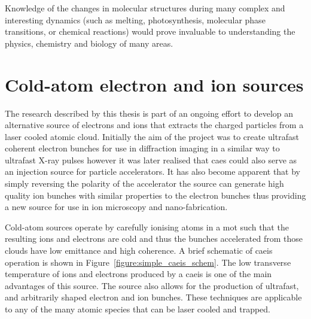 Knowledge of the changes in molecular structures during many complex and interesting dynamics (such as melting, photosynthesis, molecular phase transitions, or chemical reactions) would prove invaluable to understanding the physics, chemistry and biology of many areas.

\section{Cold-atom electron and ion sources}

The research described by this thesis is part of an ongoing effort to develop an alternative source of electrons and ions that extracts the charged particles from a laser cooled atomic cloud.
Initially the aim of the project was to create ultrafast coherent electron bunches for use in diffraction imaging in a similar way to ultrafast X-ray pulses however it was later realised that \gls{caes} could also serve as an injection source for particle accelerators.
It has also become apparent that by simply reversing the polarity of the accelerator the source can generate high quality ion bunches with similar properties to the electron bunches thus providing a new source for use in ion microscopy and nano-fabrication.

Cold-atom sources operate by carefully ionising atoms in a \gls{mot} such that the resulting ions and electrons are cold and thus the bunches accelerated from those clouds have low emittance and high coherence.
A brief schematic of \gls{caeis} operation is shown in Figure~\ref{figure:simple_caeis_schem}.
The low transverse temperature of ions and electrons produced by a \gls{caeis} is one of the main advantages of this source.
The source also allows for the production of ultrafast, and arbitrarily shaped electron and ion bunches.
These techniques are applicable to any of the many atomic species that can be laser cooled and trapped.

